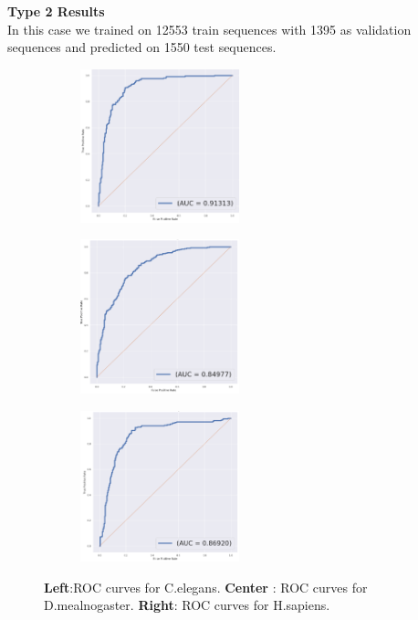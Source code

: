 \documentclass{article}
\begin{document}
\textbf{Type 2 Results} \\
In this case we trained on 12553 train sequences with 1395 as validation sequences and predicted on 1550 test sequences.\\


\begin{figure}[]
  \centering
  \begin{subfigure}{4.6cm}
    \centering\includegraphics[width=4.6cm]{C_elegans_all_roc.png}
  \end{subfigure}
  \begin{subfigure}{4.6cm}
    \centering\includegraphics[width=4.6cm]{D.mealnogaster_all_roc.png}
  \end{subfigure}
  \begin{subfigure}{4.6cm}
    \centering\includegraphics[width=4.6cm]{sapiens_all_roc.png}
  \end{subfigure}
  \caption{ 
  \textbf{Left}:ROC curves for  C.elegans.
  \textbf{Center} : ROC curves for  D.mealnogaster.
  \textbf{Right}: ROC curves for  H.sapiens.}
  \label{fig:ROC_all}
\end{figure}
\end{document}
